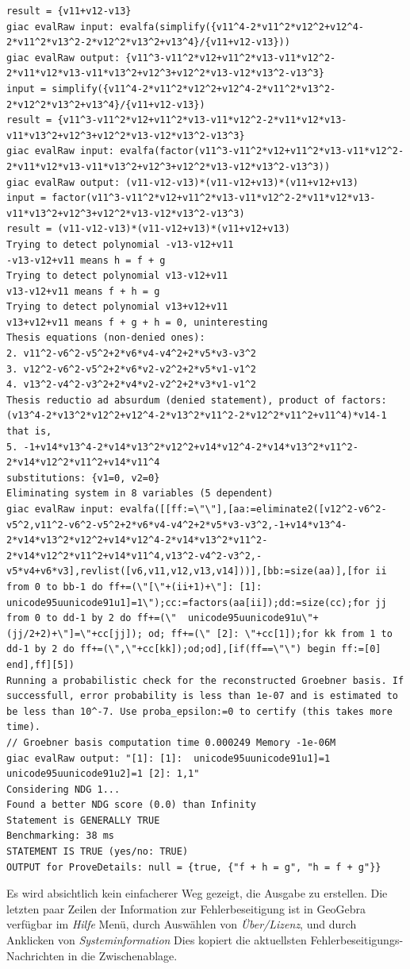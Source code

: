 \documentclass{article}
\begin{document}
{\begin{lstlisting}[language=mylog]
result = {v11+v12-v13}
giac evalRaw input: evalfa(simplify({v11^4-2*v11^2*v12^2+v12^4-2*v11^2*v13^2-2*v12^2*v13^2+v13^4}/{v11+v12-v13}))
giac evalRaw output: {v11^3-v11^2*v12+v11^2*v13-v11*v12^2-2*v11*v12*v13-v11*v13^2+v12^3+v12^2*v13-v12*v13^2-v13^3}
input = simplify({v11^4-2*v11^2*v12^2+v12^4-2*v11^2*v13^2-2*v12^2*v13^2+v13^4}/{v11+v12-v13})
result = {v11^3-v11^2*v12+v11^2*v13-v11*v12^2-2*v11*v12*v13-v11*v13^2+v12^3+v12^2*v13-v12*v13^2-v13^3}
giac evalRaw input: evalfa(factor(v11^3-v11^2*v12+v11^2*v13-v11*v12^2-2*v11*v12*v13-v11*v13^2+v12^3+v12^2*v13-v12*v13^2-v13^3))
giac evalRaw output: (v11-v12-v13)*(v11-v12+v13)*(v11+v12+v13)
input = factor(v11^3-v11^2*v12+v11^2*v13-v11*v12^2-2*v11*v12*v13-v11*v13^2+v12^3+v12^2*v13-v12*v13^2-v13^3)
result = (v11-v12-v13)*(v11-v12+v13)*(v11+v12+v13)
Trying to detect polynomial -v13-v12+v11
-v13-v12+v11 means h = f + g
Trying to detect polynomial v13-v12+v11
v13-v12+v11 means f + h = g
Trying to detect polynomial v13+v12+v11
v13+v12+v11 means f + g + h = 0, uninteresting
Thesis equations (non-denied ones):
2. v11^2-v6^2-v5^2+2*v6*v4-v4^2+2*v5*v3-v3^2
3. v12^2-v6^2-v5^2+2*v6*v2-v2^2+2*v5*v1-v1^2
4. v13^2-v4^2-v3^2+2*v4*v2-v2^2+2*v3*v1-v1^2
Thesis reductio ad absurdum (denied statement), product of factors:
(v13^4-2*v13^2*v12^2+v12^4-2*v13^2*v11^2-2*v12^2*v11^2+v11^4)*v14-1
that is,
5. -1+v14*v13^4-2*v14*v13^2*v12^2+v14*v12^4-2*v14*v13^2*v11^2-2*v14*v12^2*v11^2+v14*v11^4
substitutions: {v1=0, v2=0}
Eliminating system in 8 variables (5 dependent)
giac evalRaw input: evalfa([[ff:=\"\"],[aa:=eliminate2([v12^2-v6^2-v5^2,v11^2-v6^2-v5^2+2*v6*v4-v4^2+2*v5*v3-v3^2,-1+v14*v13^4-2*v14*v13^2*v12^2+v14*v12^4-2*v14*v13^2*v11^2-2*v14*v12^2*v11^2+v14*v11^4,v13^2-v4^2-v3^2,-v5*v4+v6*v3],revlist([v6,v11,v12,v13,v14]))],[bb:=size(aa)],[for ii from 0 to bb-1 do ff+=(\"[\"+(ii+1)+\"]: [1]:  unicode95uunicode91u1]=1\");cc:=factors(aa[ii]);dd:=size(cc);for jj from 0 to dd-1 by 2 do ff+=(\"  unicode95uunicode91u\"+(jj/2+2)+\"]=\"+cc[jj]); od; ff+=(\" [2]: \"+cc[1]);for kk from 1 to dd-1 by 2 do ff+=(\",\"+cc[kk]);od;od],[if(ff==\"\") begin ff:=[0] end],ff][5])
Running a probabilistic check for the reconstructed Groebner basis. If successfull, error probability is less than 1e-07 and is estimated to be less than 10^-7. Use proba_epsilon:=0 to certify (this takes more time).
// Groebner basis computation time 0.000249 Memory -1e-06M
giac evalRaw output: "[1]: [1]:  unicode95uunicode91u1]=1  unicode95uunicode91u2]=1 [2]: 1,1"
Considering NDG 1...
Found a better NDG score (0.0) than Infinity
Statement is GENERALLY TRUE
Benchmarking: 38 ms
STATEMENT IS TRUE (yes/no: TRUE)
OUTPUT for ProveDetails: null = {true, {"f + h = g", "h = f + g"}}
\end{lstlisting}
} %
Es wird absichtlich kein einfacherer Weg gezeigt, die Ausgabe zu erstellen. Die letzten paar Zeilen der Information zur Fehlerbeseitigung ist in GeoGebra verfügbar im \textit{Hilfe} Menü, durch Auswählen von \textit{Über/Lizenz}, und durch Anklicken von \textit{Systeminformation} Dies kopiert die aktuellsten Fehlerbeseitigungs-Nachrichten in die Zwischenablage.
\end{document}
